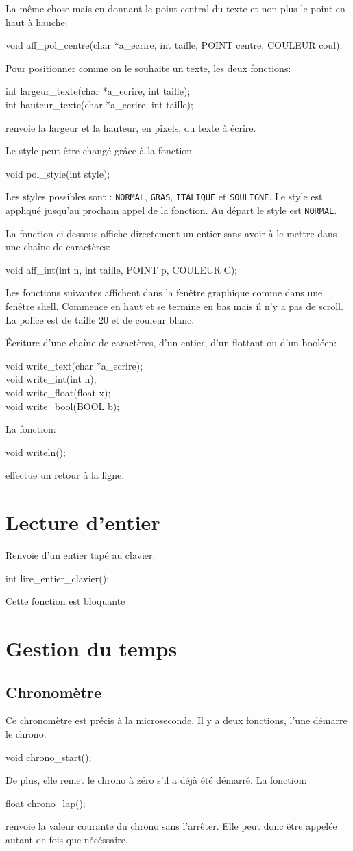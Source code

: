 \documentclass{report}
\newcommand\code[1]{
\begin{mdframed}[linecolor=purple,backgroundcolor=blue!10]
{\tt
#1
}
\end{mdframed}
}
\begin{document}
La même chose mais en donnant le point central du texte et non plus
le point en haut à hauche:
\code{
void aff\_pol\_centre(char *a\_ecrire, int taille, POINT centre, COULEUR coul);
}

Pour positionner comme on le souhaite un texte, les deux fonctions:
\code{
int largeur\_texte(char *a\_ecrire, int taille);\\
int hauteur\_texte(char *a\_ecrire, int taille);
}
renvoie la largeur et la hauteur, en pixels, du texte à écrire.

Le style peut être changé grâce à la fonction
\code{
void pol\_style(int style);
}
Les styles possibles sont : \texttt{NORMAL}, \texttt{GRAS}, \texttt{ITALIQUE} et 
\texttt{SOULIGNE}. Le style est appliqué jusqu'au prochain appel de la fonction.
Au départ le style est \texttt{NORMAL}.

La fonction ci-dessous affiche directement un entier sans avoir 
à le mettre dans une chaîne de caractères:
\code{
void aff\_int(int n, int taille, POINT p, COULEUR C);
}

Les fonctions suivantes affichent dans la fenêtre graphique comme dans 
une fenêtre shell. Commence en haut et se termine en bas mais il n'y a
pas de scroll. La police est de taille 20 et de couleur blanc.

\'Ecriture d'une chaîne de caractères, d'un entier, d'un flottant ou d'un booléen:
\code{
void write\_text(char *a\_ecrire);\\
void write\_int(int n);\\
void write\_float(float x);\\
void write\_bool(BOOL b);
}

La fonction:
\code{
void writeln();
}
effectue un retour à la ligne.

\section{Lecture d'entier}
Renvoie d'un entier tapé au clavier. 
\code{
int lire\_entier\_clavier();
}
Cette fonction est bloquante


\section{Gestion du temps}

\subsection{Chronomètre}
Ce chronomètre est précis à la microseconde.
Il y a deux fonctions, l'une démarre le chrono:
\code{
void chrono\_start();
}
De plus, elle remet le chrono à zéro s'il a déjà été démarré.
La fonction:
\code{
float chrono\_lap();
}
renvoie la valeur courante du chrono sans l'arrêter.
Elle peut donc être appelée autant de fois que nécéssaire.
\end{document}
